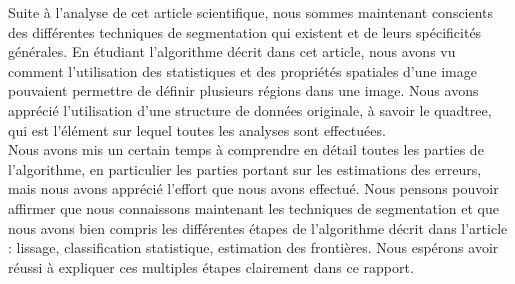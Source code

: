 Suite à l'analyse de cet article scientifique, nous sommes maintenant conscients des différentes techniques de segmentation qui existent et de leurs spécificités générales. En étudiant l'algorithme décrit dans cet article, nous avons vu comment l'utilisation des statistiques et des propriétés spatiales d'une image pouvaient permettre de définir plusieurs régions dans une image. Nous avons apprécié l'utilisation d'une structure de données originale, à savoir le quadtree, qui est l'élément sur lequel toutes les analyses sont effectuées.\\

Nous avons mis un certain temps à comprendre en détail toutes les parties de l'algorithme, en particulier les parties portant sur les estimations des erreurs, mais nous avons apprécié l'effort que nous avons effectué. Nous pensons pouvoir affirmer que nous connaissons maintenant les techniques de segmentation et que nous avons bien compris les différentes étapes de l'algorithme décrit dans l'article : lissage, classification statistique, estimation des frontières. Nous espérons avoir réussi à expliquer ces multiples étapes clairement dans ce rapport.